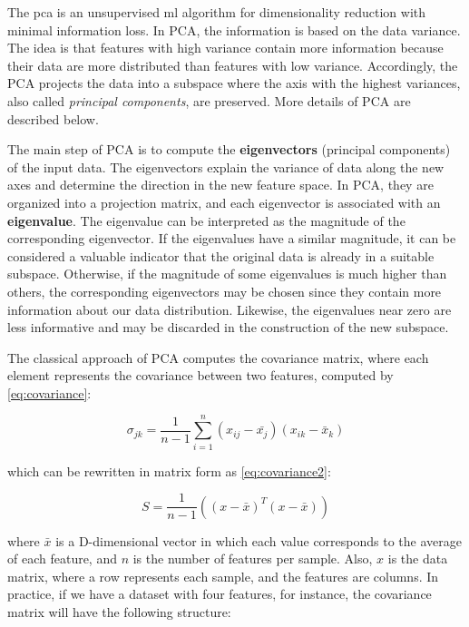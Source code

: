 The \acf{pca} \citep{pca} is an unsupervised \acl{ml} algorithm for dimensionality reduction with minimal information loss. In PCA, the information is based on the data variance. The idea is that features with high variance contain more information because their data are more distributed than features with low variance. Accordingly, the PCA projects the data into a subspace where the axis with the highest variances, also called \textit{principal components}, are preserved. More details of PCA are described below.

The main step of PCA is to compute the \textbf{eigenvectors} (principal components) of the input data. The eigenvectors explain the variance of data along the new axes and determine the direction in the new feature space. In PCA, they are organized into a projection matrix, and each eigenvector is associated with an \textbf{eigenvalue}. The eigenvalue can be interpreted as the magnitude of the corresponding eigenvector. If the eigenvalues have a similar magnitude, it can be considered a valuable indicator that the original data is already in a suitable subspace. Otherwise, if the magnitude of some eigenvalues is much higher than others, the corresponding eigenvectors may be chosen since they contain more information about our data distribution. Likewise, the eigenvalues near zero are less informative and may be discarded in the construction of the new subspace. 

The classical approach of PCA \citep{pca} computes the covariance matrix, where each element represents the covariance between two features, computed by \autoref{eq:covariance}:

\begin{equation}
\label{eq:covariance}
\sigma_{jk} = \frac{1}{n-1}\sum_{i=1}^{n}(x_{ij} - \bar{x_j})(x_{ik} - \bar{x}_k)
\end{equation}

\noindent
which can be rewritten in matrix form as \autoref{eq:covariance2}:

\begin{equation}
\label{eq:covariance2}
S = \frac{1}{n-1}((x - \bar{x})^T(x - \bar{x}))
\end{equation}

\noindent
where $\bar{x}$ is a D-dimensional vector in which each value corresponds to the average of each feature, and $n$ is the number of features per sample. Also, $x$ is the data matrix, where a row represents each sample, and the features are columns. In practice, if we have a dataset with four features, for instance, the covariance matrix will have the following structure:

